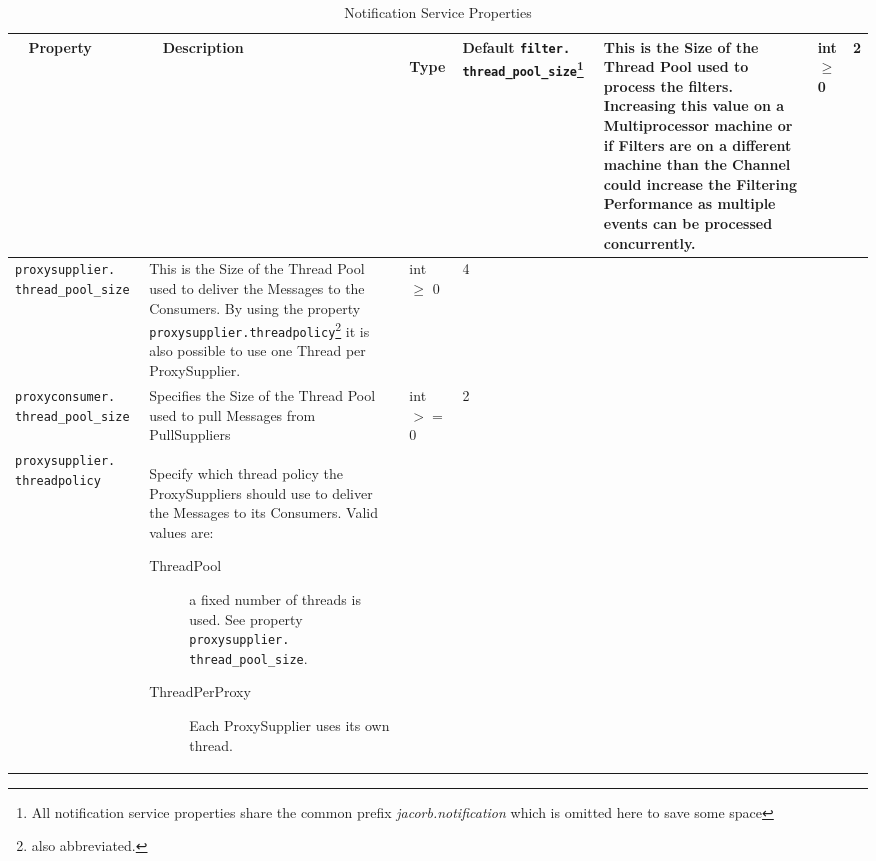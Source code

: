 \begin{small}
  \begin{longtable}{|p{5cm}|p{7.5cm}|p{1.5cm}|p{1.5cm}|}
    \caption{Notification Service Properties}\\
    \hline
    ~ \hfill \textbf {Property} \hfill ~ & ~ \hfill \textbf {Description}
    \hfill ~ & ~ \hfill \textbf {Type} \hfill ~ & \hfill \textbf{Default} \endhead
    \hline
    \verb"filter."
    \verb"thread_pool_size"\footnote{All notification service
    properties share the common prefix \emph{jacorb.notification} which
    is omitted here to save some space} &

    This is the Size of the Thread Pool used to process the filters.
    Increasing this value on a Multiprocessor machine or if Filters are on
    a different machine than the Channel could increase the Filtering
    Performance as multiple events can be processed concurrently. & 
    
    int $\geq$ 0 &

    2 \\
    \hline

    \verb"proxysupplier."
    \verb"thread_pool_size" &

    This is the Size of the Thread Pool used to deliver the Messages to
    the Consumers. By using the property
    \texttt{proxysupplier.threadpolicy}\footnote{also abbreviated.}
    it is also possible to use one Thread per ProxySupplier. &

    int $\geq$ 0 & 
    4 \\ \hline    

    \verb"proxyconsumer."
    \verb"thread_pool_size" &

    Specifies the Size of the Thread Pool used to pull Messages from
    PullSuppliers &

    int $>=$ 0 & 

    2 \\ \hline

    \verb"proxysupplier."
    \verb"threadpolicy" &

    Specify which thread policy the ProxySuppliers should use to deliver
    the Messages to its Consumers. Valid values are: 
    \begin{description}     
    \item[ThreadPool] a fixed number of threads is used. See property
      \verb"proxysupplier."
      \verb"thread_pool_size".

    \item[ThreadPerProxy] Each ProxySupplier uses its own thread.
      

\end{description}
\end{longtable}
\end{small}
